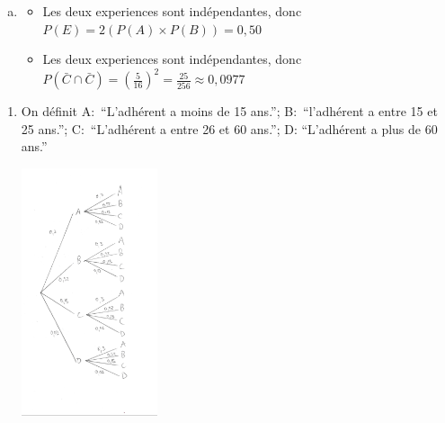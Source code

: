 \documentclass[12pt, a4paper]{article}
\begin{document}
\begin{Exercise}[number={71}]
\begin{enumerate}[a)]
        \item \begin{itemize}
                \item Les deux experiences sont indépendantes, donc $P(E)=2(P(A)\times P(B))=0{,}50$
                \item Les deux experiences sont indépendantes, donc $P(\bar{C}\cap\bar{C})=\left(\frac{5}{16}\right)^2=\frac{25}{256}\approx 0{,}0977$
              \end{itemize}
      \end{enumerate}
    \end{Exercise}

    \begin{Exercise}[number={73}]
      \begin{enumerate}[1)]
        \item On définit A:~``L'adhérent a moins de 15 ans.''; B:~``l'adhérent a entre 15 et 25 ans.''; C:~``L'adhérent a entre 26 et 60 ans.''; D: ``L'adhérent a plus de 60 ans.'' \\\parbox{\linewidth}{
                    \centering
                    \includegraphics[width=4cm]{VAimg3.jpg}
                  } \medbreak


\end{enumerate}
\end{Exercise}
\end{document}
